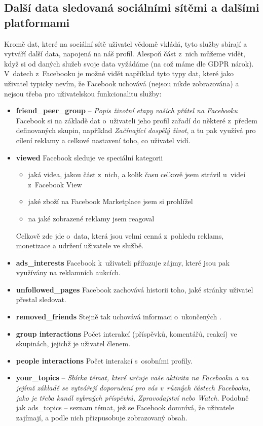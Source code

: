 \subsection{Další data sledovaná sociálními sítěmi a dalšími platformami}
Kromě dat, které na sociální sítě uživatel vědomě vkládá, tyto služby sbírají a vytváří další data, napojená na náš profil. Alespoň část z~nich můžeme vidět, když si od daných služeb svoje data vyžádáme (na což máme dle GDPR nárok).
V~datech z~Facebooku je možné vidět například tyto typy dat, které jako uživatel typicky nevím, že Facebook uchovává (nejsou nikde zobrazována) a nejsou třeba pro uživatelskou funkcionalitu služby:
\begin{itemize}
	\item \textbf{friend\_peer\_group} -- \textit{Popis životní etapy vašich přátel na Facebooku}\\
	Facebook si na základě dat o~uživateli jeho profil zařadí do některé z~předem definovaných skupin, například \textit{Začínající dospělý život}, a tu pak využívá pro cílení reklamy a celkové nastavení toho, co uživatel vidí.
	
	\item \textbf{viewed}
	Facebook sleduje ve speciální kategorii
	\begin{itemize}
		\item jaká videa, jakou část z~nich, a kolik času celkově jsem strávil u~videí z~Facebook View
		\item jaké zboží na Facebook Marketplace jsem si prohlížel
		\item na jaké zobrazené reklamy jsem reagoval
	\end{itemize}
	Celkově zde jde o~data, která jsou velmi cenná z~pohledu reklams, monetizace a udržení uživatele ve službě.
	
	\item \textbf{ads\_interests}
	Facebook k~uživateli přiřazuje zájmy, které jsou pak využívány na reklamních aukcích.

	\item \textbf{unfollowed\_pages}
	Facebook zachovává historii toho, jaké stránky uživatel přestal sledovat.

	\item \textbf{removed\_friends}
	Stejně tak uchovává informaci o~ukončených .

	\item \textbf{group interactions}
	Počet interakcí (příspěvků, komentářů, reakcí) ve skupinách, jejichž je uživatel členem.

	\item \textbf{people interactions}
	Počet interakcí s~osobními profily.

	\item \textbf{your\_topics} -- \textit{Sbírka témat, které určuje vaše aktivita na Facebooku a na jejímž základě se vytvářejí doporučení pro vás v~různých částech Facebooku, jako je třeba kanál vybraých příspěvků, Zpravodajství nebo Watch.}
	Podobně jak ads\_topics -- seznam témat, jež se Facebook domnívá, že uživatele zajímají, a podle nich přizpusobuje zobrazovaný obsah.
\end{itemize}

